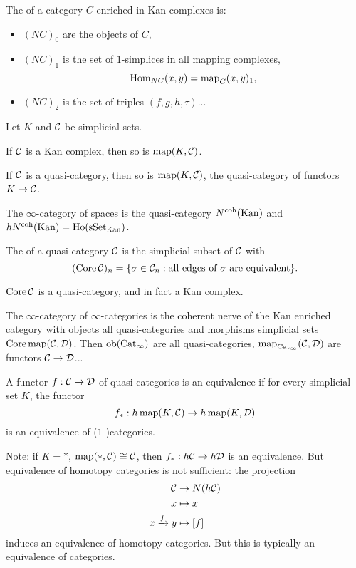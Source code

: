 The  of a category $C$ enriched in Kan complexes is:
\begin{itemize}
    \item $(NC)_0$ are the objects of $C$,
    \item $(NC)_1$ is the set of $1$-simplices in all mapping complexes,
    \[\operatorname{Hom}_{NC}(x,y)=\operatorname{map}_C(x,y)_1,\]
    \item $(NC)_2$ is the set of triples $(f,g,h,\tau)$...
\end{itemize}

\begin{proposition}
Let $K$ and $\mathcal{C}$ be simplicial sets.
\begin{numerate}
\item If $\mathcal{C}$ is a Kan complex, then so is $\operatorname{map}(K,\mathcal{C})$.
\item If $\mathcal{C}$ is a quasi-category, then so is $\operatorname{map}(K,\mathcal{C})$, the quasi-category of functors $K\to\mathcal{C}$.
\end{numerate}
\end{proposition}

The $\infty$-category of spaces is the quasi-category $N^\text{coh}({\mathrm{Kan}})$ and $hN^\text{coh}({\mathrm{Kan}})=\operatorname{Ho}({\mathrm{sSet}}_\text{Kan})$.

The  of a quasi-category $\mathcal{C}$ is the simplicial subset of $\mathcal{C}$ with
\[(\operatorname{Core}\mathcal{C})_n=\{\sigma\in\mathcal{C}_n:\text{all edges of }\sigma\text{ are equivalent}\}.\]

\begin{theorem}
$\operatorname{Core}\mathcal{C}$ is a quasi-category, and in fact a Kan complex.
\end{theorem}

The $\infty$-category of $\infty$-categories is the coherent nerve of the Kan enriched category with objects all quasi-categories and morphisms simplicial sets $\operatorname{Core}\operatorname{map}(\mathcal{C},\mathcal{D})$. Then $\operatorname{ob}({\mathrm{Cat}}_\infty)$ are all quasi-categories, $\operatorname{map}_{{\mathrm{Cat}}_\infty}(\mathcal{C},\mathcal{D})$ are functors $\mathcal{C}\to\mathcal{D}$...

A functor $f:\mathcal{C}\to\mathcal{D}$ of quasi-categories is an equivalence if for every simplicial set $K$, the functor
\[f_*:h\operatorname{map}(K,\mathcal{C})\to h\operatorname{map}(K,\mathcal{D})\]
is an equivalence of ($1$-)categories.

Note: if $K=*$, $\operatorname{map}(*,\mathcal{C})\cong\mathcal{C}$, then $f_*:h\mathcal{C}\to h\mathcal{D}$ is an equivalence. But equivalence of homotopy categories is not sufficient: the projection
\begin{align*}
    \mathcal{C}&\to N(h\mathcal{C})\\
    x&\mapsto x\\
    x\xrightarrow{f}y&\mapsto[f]
\end{align*}
induces an equivalence of homotopy categories. But this is typically  an equivalence of categories.

